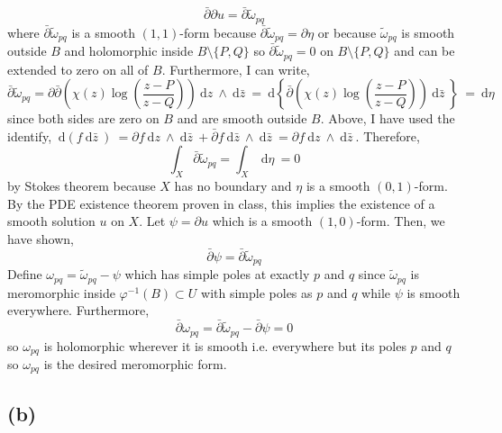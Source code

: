 \documentclass[12pt]{extarticle}
\renewcommand{\d}[1]{\: \mathrm{d}#1 \:}
\theoremstyle{definition}
\begin{document}
\[ \bar{\partial} \partial u = \bar{\partial} \tilde{\omega}_{pq} \]
where $\bar{\partial} \tilde{\omega}_{pq}$ is a smooth $(1,1)$-form because $\bar{\partial} \tilde{\omega}_{pq} = \partial \eta$ or because $\tilde{\omega}_{pq}$ is smooth outside $B$ and holomorphic inside $B \setminus \{P,Q\}$ so $\bar{\partial} \tilde{\omega}_{pq} = 0$ on $B \setminus \{P,Q\}$ and can be extended to zero on all of $B$. Furthermore,
I can write, 
\[ \bar{\partial} \tilde{\omega}_{pq} = \partial \bar{\partial} \left( \chi(z) \log{\left( \frac{z - P}{z - Q} \right)} \right) \d{z} \wedge \d{\bar{z}} = \d{\left\{ \bar{\partial} \left( \chi(z) \log{\left( \frac{z - P}{z - Q} \right)} \right) \d{\bar{z}} \right\}} = \d{\eta} \]
since both sides are zero on $B$ and are smooth outside $B$. Above, I have used the identify, $\d{(f \d{\bar{z}})} = \partial f \d{z} \wedge \d{\bar{z}} + \bar{\partial} f \d{\bar{z}} \wedge \d{\bar{z}} = \partial f \d{z} \wedge \d{\bar{z}}$. Therefore,
\[ \int_X \bar{\partial} \tilde{\omega}_{pq} = \int_X \d{\eta} = 0 \]
by Stokes theorem because $X$ has no boundary and $\eta$ is a smooth $(0,1)$-form. By the PDE existence theorem proven in class, this implies the existence of a smooth solution $u$ on $X$. Let $\psi = \partial u$ which is a smooth $(1,0)$-form. Then, we have shown,
\[ \bar{\partial} \psi = \bar{\partial} \tilde{\omega}_{pq} \]
Define $\omega_{pq} = \tilde{\omega}_{pq} - \psi$ which has simple poles at exactly $p$ and $q$ since $\tilde{\omega}_{pq}$ is meromorphic inside $\varphi^{-1}(B) \subset U$ with simple poles as $p$ and $q$ while $\psi$ is smooth everywhere. Furthermore,
\[ \bar{\partial} \omega_{pq} = \bar{\partial} \tilde{\omega}_{pq} - \bar{\partial} \psi = 0 \]
so $\omega_{pq}$ is holomorphic wherever it is smooth i.e. everywhere but its poles $p$ and $q$ so $\omega_{pq}$ is the desired meromorphic form.

\subsection*{(b)}
\end{document}
